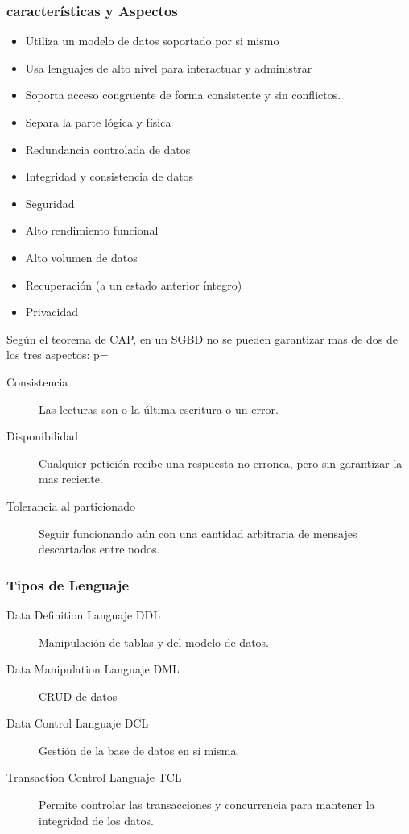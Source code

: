     \subsubsection{características y Aspectos}
        \begin{itemize}
            \item Utiliza un modelo de datos soportado por si mismo
            \item Usa lenguajes de alto nivel para interactuar y administrar
            \item Soporta acceso congruente de forma consistente y sin conflictos.
            \item Separa la parte lógica y física
            \item Redundancia controlada de datos
            \item Integridad y consistencia de datos
            \item Seguridad
            \item Alto rendimiento funcional
            \item Alto volumen de datos
            \item Recuperación (a un estado anterior íntegro)
            \item Privacidad
        \end{itemize}
        Según el teorema de CAP, en un SGBD no se pueden garantizar mas de dos de los tres aspectos:
        p=\begin{description}
            \item[Consistencia] Las lecturas son o la última escritura o un error.
            \item[Disponibilidad] Cualquier petición recibe una respuesta no erronea, pero sin garantizar la mas reciente.
            \item[Tolerancia al particionado] Seguir funcionando aún con una cantidad arbitraria de mensajes descartados entre nodos.
        \end{description}

    \subsubsection{Tipos de Lenguaje}
        \begin{description}
            \item[Data Definition Languaje DDL] Manipulación de tablas y del modelo de datos.
            \item[Data Manipulation Languaje DML] CRUD de datos
            \item[Data Control Languaje DCL] Gestión de la base de datos en sí misma.
            \item[Transaction Control Languaje TCL] Permite controlar las transacciones y concurrencia para mantener la integridad de los datos.
        \end{description}


